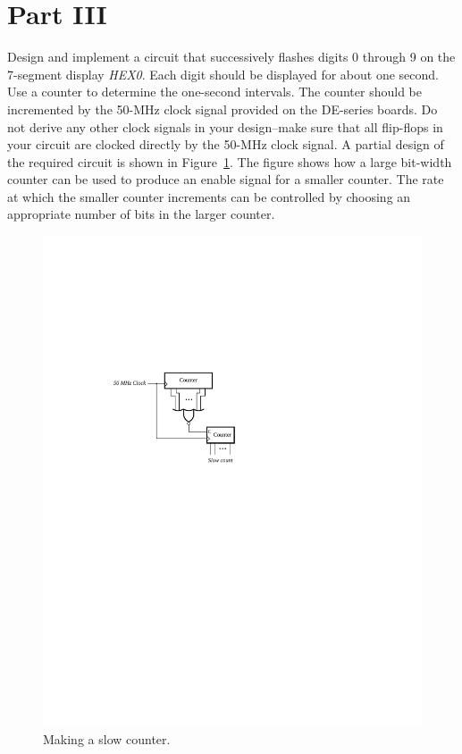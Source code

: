 \documentclass[epsfig,10pt,fullpage]{article}
\begin{document}
\section*{Part III}
Design and implement a circuit that successively flashes digits 0 
through 9 on the 7-segment display {\it HEX0}. Each digit should be 
displayed for about one second. Use a counter to determine the one-second 
intervals. The counter should be incremented by the 50-MHz clock signal 
provided on the DE-series boards. Do not derive any other clock signals in your design--make 
sure that all flip-flops in your circuit are clocked directly by the 50-MHz clock signal.
A partial design of the required circuit is shown in Figure~\ref{fig:hint}. The figure
shows how a large bit-width counter can be used to produce an enable signal for a smaller
counter. The rate at which the smaller counter increments can be controlled by choosing an
appropriate number of bits in the larger counter.

\begin{figure}[H]
	\begin{center}
		\includegraphics[]{figures/figure_hint.pdf}
	\end{center}
\caption{Making a slow counter.}
\label{fig:hint}
\end{figure}
\end{document}
